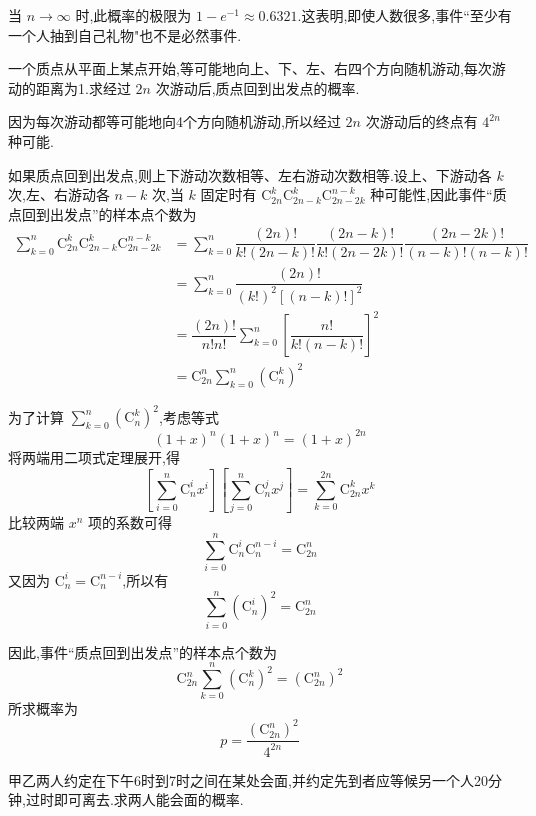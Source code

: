 \begin{note}
    \indent 当 $n \to \infty$ 时,此概率的极限为 $1 - e^{-1} \approx 0.6321$.这表明,即使人数很多,事件``至少有一个人抽到自己礼物"也不是必然事件.
\end{note}

\question 一个质点从平面上某点开始,等可能地向上、下、左、右四个方向随机游动,每次游动的距离为1.求经过 $2n$ 次游动后,质点回到出发点的概率.

\begin{solution}
    因为每次游动都等可能地向4个方向随机游动,所以经过 $2n$ 次游动后的终点有 $4^{2n}$ 种可能.

    如果质点回到出发点,则上下游动次数相等、左右游动次数相等.设上、下游动各 $k$ 次,左、右游动各 $n-k$ 次,当 $k$ 固定时有 $\mathrm{C}_{2n}^k \mathrm{C}_{2n-k}^k \mathrm{C}_{2n-2k}^{n-k}$ 种可能性,因此事件``质点回到出发点''的样本点个数为
    $$
    \begin{aligned}
        \sum_{k=0}^{n} \mathrm{C}_{2n}^k \mathrm{C}_{2n-k}^k \mathrm{C}_{2n-2k}^{n-k} &= \sum_{k=0}^{n} \dfrac{(2n)!}{k! (2n-k)!} \dfrac{(2n-k)!}{k! (2n-2k)!} \dfrac{(2n-2k)!}{(n-k)! (n-k)!} \\
        &= \sum_{k=0}^{n} \dfrac{(2n)!}{(k!)^2 [(n-k)!]^2} \\
        &= \dfrac{(2n)!}{n! n!} \sum_{k=0}^{n} \left[ \dfrac{n!}{k! (n-k)!} \right]^2 \\
        &= \mathrm{C}_{2n}^n \sum_{k=0}^{n} (\mathrm{C}_n^k)^2
    \end{aligned}
    $$

    为了计算 $\displaystyle\sum_{k=0}^{n} (\mathrm{C}_n^k)^2$,考虑等式
    $$
    (1+x)^n (1+x)^n = (1+x)^{2n}
    $$
    将两端用二项式定理展开,得
    $$
    \left[ \sum_{i=0}^{n} \mathrm{C}_n^i x^i \right] \left[ \sum_{j=0}^{n} \mathrm{C}_n^j x^j \right] = \sum_{k=0}^{2n} \mathrm{C}_{2n}^k x^k
    $$
    比较两端 $x^n$ 项的系数可得
    $$
    \sum_{i=0}^{n} \mathrm{C}_n^i \mathrm{C}_n^{n-i} = \mathrm{C}_{2n}^n
    $$
    又因为 $\mathrm{C}_n^i = \mathrm{C}_n^{n-i}$,所以有
    $$
    \sum_{i=0}^{n} (\mathrm{C}_n^i)^2 = \mathrm{C}_{2n}^n
    $$
    
    因此,事件``质点回到出发点''的样本点个数为
    $$
    \mathrm{C}_{2n}^n \sum_{k=0}^{n} (\mathrm{C}_n^k)^2 = (\mathrm{C}_{2n}^n)^2
    $$
    所求概率为
    $$
    p = \dfrac{(\mathrm{C}_{2n}^n)^2}{4^{2n}}
    $$
\end{solution}


\question[会面问题] 甲乙两人约定在下午6时到7时之间在某处会面,并约定先到者应等候另一个人20分钟,过时即可离去.求两人能会面的概率.

